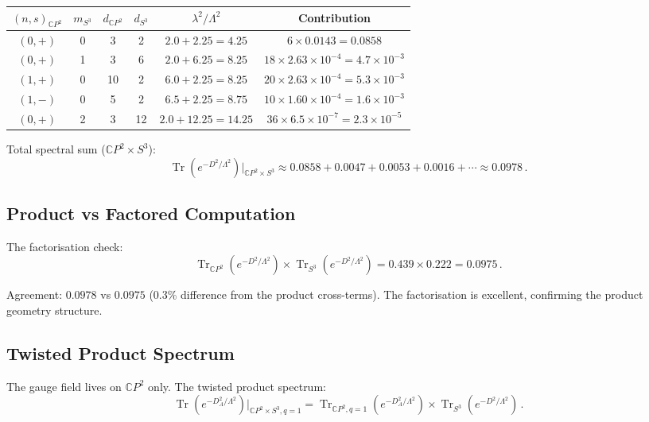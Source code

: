 \documentclass[11pt,a4paper]{article}
\newcommand{\Tr}{\operatorname{Tr}}
\newcommand{\CP}{\mathbb{C}P}
\begin{document}
\begin{center}
\begin{longtable}{cccccc}
\toprule
$(n,s)_{\CP^2}$ & $m_{S^3}$ & $d_{\CP^2}$ & $d_{S^3}$ & $\lambda^2/\Lambda^2$ & Contribution \\
\midrule
$(0,+)$ & 0 & 3 & 2 & $2.0 + 2.25 = 4.25$ & $6 \times 0.0143 = 0.0858$ \\
$(0,+)$ & 1 & 3 & 6 & $2.0 + 6.25 = 8.25$ & $18 \times 2.63\times10^{-4} = 4.7\times10^{-3}$ \\
$(1,+)$ & 0 & 10 & 2 & $6.0 + 2.25 = 8.25$ & $20 \times 2.63\times10^{-4} = 5.3\times10^{-3}$ \\
$(1,-)$ & 0 & 5 & 2 & $6.5 + 2.25 = 8.75$ & $10 \times 1.60\times10^{-4} = 1.6\times10^{-3}$ \\
$(0,+)$ & 2 & 3 & 12 & $2.0 + 12.25 = 14.25$ & $36 \times 6.5\times10^{-7} = 2.3\times10^{-5}$ \\
\bottomrule
\end{longtable}
\end{center}

Total spectral sum ($\CP^2 \times S^3$):
\begin{equation}
\Tr(e^{-D^2/\Lambda^2})\bigg|_{\CP^2 \times S^3} \approx 0.0858 + 0.0047 + 0.0053 + 0.0016 + \cdots \approx 0.0978\,.
\end{equation}

\subsection{Product vs Factored Computation}

The factorisation check:
\begin{equation}
\Tr_{\CP^2}(e^{-D^2/\Lambda^2}) \times \Tr_{S^3}(e^{-D^2/\Lambda^2}) = 0.439 \times 0.222 = 0.0975\,.
\end{equation}

Agreement: $0.0978$ vs $0.0975$ (0.3\% difference from the product cross-terms). The factorisation is excellent, confirming the product geometry structure.

\subsection{Twisted Product Spectrum}

The gauge field lives on $\CP^2$ only. The twisted product spectrum:
\begin{equation}
\Tr(e^{-D_{A}^2/\Lambda^2})\bigg|_{\CP^2 \times S^3, q=1} = \Tr_{\CP^2,q=1}(e^{-D_A^2/\Lambda^2}) \times \Tr_{S^3}(e^{-D^2/\Lambda^2})\,.
\end{equation}
\end{document}

